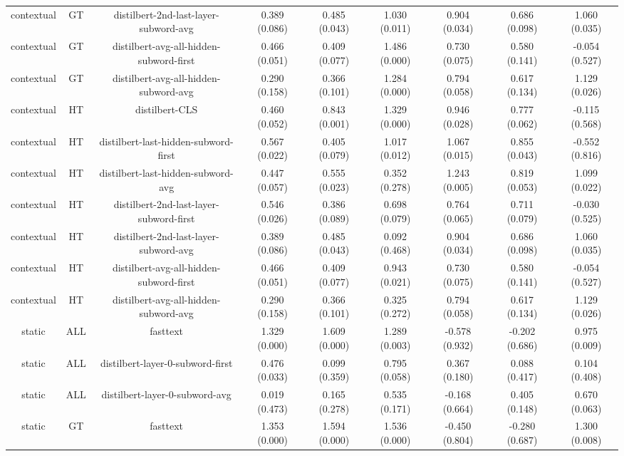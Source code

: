\begin{sidewaystable}[htb]
\begin{tabular}{@{}ccccccccc@{}}
        contextual & GT & distilbert-2nd-last-layer-subword-avg & 0.389 (0.086) & 0.485 (0.043) & 1.030 (0.011) & 0.904 (0.034) & 0.686 (0.098) & 1.060 (0.035) \\
        contextual & GT & distilbert-avg-all-hidden-subword-first & 0.466 (0.051) & 0.409 (0.077) & 1.486 (0.000) & 0.730 (0.075) & 0.580 (0.141) & -0.054 (0.527) \\
        contextual & GT & distilbert-avg-all-hidden-subword-avg & 0.290 (0.158) & 0.366 (0.101) & 1.284 (0.000) & 0.794 (0.058) & 0.617 (0.134) & 1.129 (0.026) \\
        contextual & HT & distilbert-CLS & 0.460 (0.052) & 0.843 (0.001) & 1.329 (0.000) & 0.946 (0.028) & 0.777 (0.062) & -0.115 (0.568) \\
        contextual & HT & distilbert-last-hidden-subword-first & 0.567 (0.022) & 0.405 (0.079) & 1.017 (0.012) & 1.067 (0.015) & 0.855 (0.043) & -0.552 (0.816) \\
        contextual & HT & distilbert-last-hidden-subword-avg & 0.447 (0.057) & 0.555 (0.023) & 0.352 (0.278) & 1.243 (0.005) & 0.819 (0.053) & 1.099 (0.022) \\
        contextual & HT & distilbert-2nd-last-layer-subword-first & 0.546 (0.026) & 0.386 (0.089) & 0.698 (0.079) & 0.764 (0.065) & 0.711 (0.079) & -0.030 (0.525) \\
        contextual & HT & distilbert-2nd-last-layer-subword-avg & 0.389 (0.086) & 0.485 (0.043) & 0.092 (0.468) & 0.904 (0.034) & 0.686 (0.098) & 1.060 (0.035) \\
        contextual & HT & distilbert-avg-all-hidden-subword-first & 0.466 (0.051) & 0.409 (0.077) & 0.943 (0.021) & 0.730 (0.075) & 0.580 (0.141) & -0.054 (0.527) \\
        contextual & HT & distilbert-avg-all-hidden-subword-avg & 0.290 (0.158) & 0.366 (0.101) & 0.325 (0.272) & 0.794 (0.058) & 0.617 (0.134) & 1.129 (0.026) \\
        static & ALL & fasttext & 1.329 (0.000) & 1.609 (0.000) & 1.289 (0.003) & -0.578 (0.932) & -0.202 (0.686) & 0.975 (0.009) \\
        static & ALL & distilbert-layer-0-subword-first & 0.476 (0.033) & 0.099 (0.359) & 0.795 (0.058) & 0.367 (0.180) & 0.088 (0.417) & 0.104 (0.408) \\
        static & ALL & distilbert-layer-0-subword-avg & 0.019 (0.473) & 0.165 (0.278) & 0.535 (0.171) & -0.168 (0.664) & 0.405 (0.148) & 0.670 (0.063) \\
        static & GT & fasttext & 1.353 (0.000) & 1.594 (0.000) & 1.536 (0.000) & -0.450 (0.804) & -0.280 (0.687) & 1.300 (0.008) \\

\end{tabular}
\end{sidewaystable}
